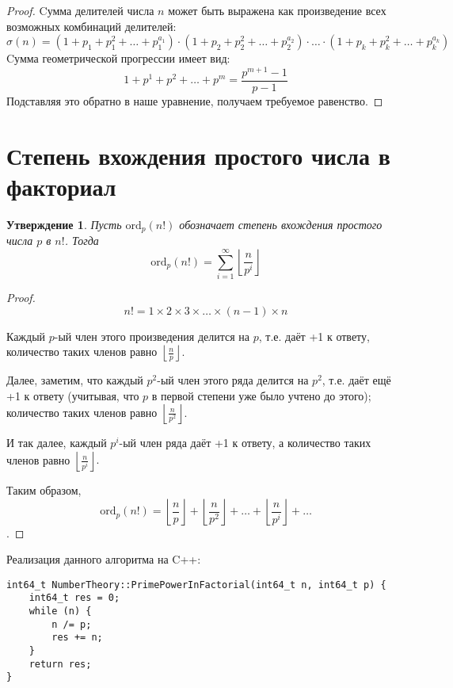 \documentclass[12pt, a4paper, openany]{book}
\newtheorem*{statement}{Утверждение}
\begin{document}
\begin{proof}
Cумма делителей числа \( n \) может быть выражена как произведение всех возможных комбинаций делителей:
\[
\sigma(n) = (1 + p_1 + p_1^2 + \ldots + p_1^{a_1}) \cdot (1 + p_2 + p_2^2 + \ldots + p_2^{a_2}) \cdot \ldots \cdot (1 + p_k + p_k^2 + \ldots + p_k^{a_k})
\]
\noindent
Cумма геометрической прогрессии имеет вид:
\[
1 + p^1 + p^2 + \ldots + p^m = \frac{{p^{m+1} - 1}}{{p - 1}}
\]
\noindent
Подставляя это обратно в наше уравнение, получаем требуемое равенство.
\end{proof}

\section{Степень вхождения простого числа в факториал}

\begin{statement}
Пусть $\text{ord}_p(n!)$ обозначает степень вхождения простого числа $p$ в $n!$. Тогда
\begin{equation}\text{ord}_p(n!) = \sum_{i=1}^{\infty} \left\lfloor \frac{n}{p^i} \right\rfloor\end{equation}
\end{statement}

\begin{proof}
\[n! = 1 \times 2 \times 3 \times \ldots \times (n-1) \times n\]

Каждый $p$-ый член этого произведения делится на $p$, т.е. даёт +1 к ответу, количество таких членов равно $\left\lfloor \frac{n}{p} \right\rfloor.$

Далее, заметим, что каждый $p^2$-ый член этого ряда делится на $p^2$, т.е. даёт ещё +1 к ответу (учитывая, что $p$ в первой степени уже было учтено до этого); количество таких членов равно $\left\lfloor \frac{n}{p^2} \right\rfloor$.

И так далее, каждый $p^i$-ый член ряда даёт +1 к ответу, а количество таких членов равно $\left\lfloor \frac{n}{p^i} \right\rfloor.$

Таким образом, \[\text{ord}_p(n!) = \left\lfloor\frac{n}{p}\right\rfloor + \left\lfloor\frac{n}{p^2}\right\rfloor + \ldots + \left\lfloor\frac{n}{p^i}\right\rfloor + \ldots\].
\end{proof}

\newpage

\noindent
Реализация данного алгоритма на C++:
\begin{lstlisting}[breaklines=true]
int64_t NumberTheory::PrimePowerInFactorial(int64_t n, int64_t p) {
	int64_t res = 0;
	while (n) {
		n /= p;
		res += n;
	}
	return res;
}
\end{lstlisting}
\end{document}
